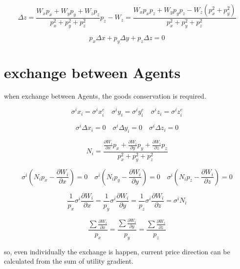 \documentclass[12pt,a4paper]{article}
\begin{document}
\[
\Delta z =\frac{W_xp_x+W_yp_y+W_zp_z}{p_x^2+p_y^2+p_z^2}p_z - W_z = \frac{W_xp_xp_z+W_yp_yp_z-W_z(p_x^2+p_y^2)}{p_x^2+p_y^2+p_z^2}
\]

\[
 p_x\Delta x + p_y\Delta y + p_z\Delta z  = 0
\]


\section{exchange between Agents}
when exchange between Agents, the goods conservation is required.

\[
\sigma^ix_i = \sigma^ix_i^e \quad \sigma^iy_i = \sigma^iy_i^e \quad \sigma^iz_i = \sigma^iz_i^e
\]

\[
\sigma^i\Delta x_i = 0 \quad \sigma^i\Delta y_i = 0 \quad \sigma^i\Delta z_i = 0
\]

\[
N_i  = \frac{\frac{\partial W_i}{\partial x}p_x+\frac{\partial W_i}{\partial y}p_y+\frac{\partial W_i}{\partial z}p_z}{p_x^2+p_y^2+p_z^2}
\]


\[
\sigma^i(N_ip_x -\frac{\partial W_i}{\partial x} ) = 0 \quad \sigma^i(N_ip_y -\frac{\partial W_i}{\partial y} ) = 0
\quad \sigma^i(N_ip_z -\frac{\partial W_i}{\partial z} ) = 0
\]

\[
\frac{1}{p_x}\sigma^i\frac{\partial W_i}{\partial x} = \frac{1}{p_y}\sigma^i\frac{\partial W_i}{\partial y} = \frac{1}{p_z}\sigma^i\frac{\partial W_i}{\partial z} = \sigma^iN_i
\]

\[
\frac{\sum \frac{\partial W_i}{\partial x}}{p_x} = \frac{\sum \frac{\partial W_i}{\partial y}}{p_y}
= \frac{\sum \frac{\partial W_i}{\partial z}}{p_z}
\]

so, even individually the exchange is happen, current price direction can be calculated from the sum of utility gradient.
\end{document}
